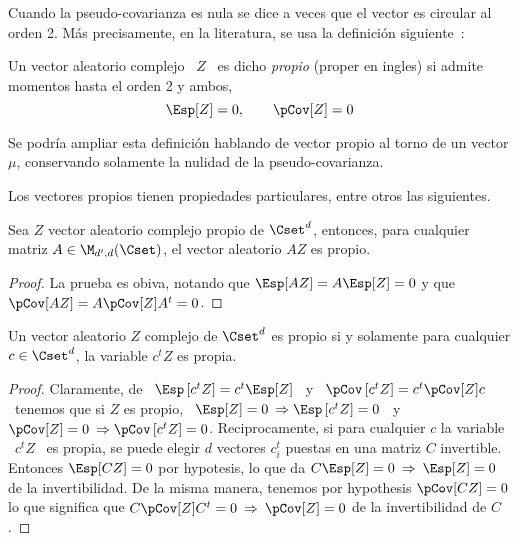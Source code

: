 Cuando la pseudo-covarianza es nula se dice a veces que el vector es circular al
orden  2.  M\'as  precisamente,  en   la  literatura,  se  usa  la  definici\'on
siguiente~\cite[Def.~17.4.1]{Lap17}:
%
\begin{definicion}\label{Def:MP:VectorAleatorioComplejoPropio}
%
  Un vector aleatorio complejo \ $Z$  \ es dicho {\em propio} (proper en ingles)
  si admite momentos hasta el orden 2 y ambos,
  \[
  \Esp[Z] = 0, \qquad \pCov[Z] = 0
  \]
\end{definicion}
%
Se podr\'ia ampliar  esta definici\'on hablando de vector propio  al torno de un
vector $\mu$, conservando solamente la nulidad de la pseudo-covarianza.

Los vectores propios tienen  propiedades particulares, entre otros las siguientes.

\begin{teorema}\label{Teo:MP:PropioLineal}
%
  Sea  $Z$  vector  aleatorio  complejo  propio  de  $\Cset^d$,  entonces,  para
  cualquier matriz $A \in \M_{d',d}(\Cset)$, el vector aleatorio $A Z$ es propio.
\end{teorema}
\begin{proof}
  La prueba es obiva, notando que $\Esp[A Z]  = A \Esp[Z] = 0$ y que $\pCov[A Z]
  = A \pCov[Z] A^t = 0$.
\end{proof}


\begin{teorema}\label{Teo:MP:PropioProy}
%
  Un vector  aleatorio $Z$ complejo de  $\Cset^d$ es propio si  y solamente para
  cualquier $c \in \Cset^d$, la variable $c^t Z$ es propia.
\end{teorema}
\begin{proof}
  Claramente, de \  $\Esp\left[ c^t Z \right] = c^t \Esp[Z]$  \ y \ $\pCov\left[
    c^t Z \right] = c^t \pCov[Z] c$ \ tenemos que si $Z$ es propio, \ $\Esp[Z] =
  0  \: \Rightarrow  \Esp\left[ c^t  Z  \right] =  0$ \  y  \ $\pCov[Z]  = 0  \:
  \Rightarrow \pCov\left[  c^tZ \right] =  0$. \newline Reciprocamente,  si para
  cualquier $c$ la variable \ $c^t Z$  \ es propia, se puede elegir $d$ vectores
  $c_i^t$ puestas  en una matriz  $C$ invertible. Entonces  $\Esp[C Z] =  0$ por
  hypotesis, lo  que da  $C \Esp[Z] =  0 \:  \Rightarrow \: \Esp[Z]  = 0$  de la
  invertibilidad. De la misma manera, tenemos por hypothesis $\pCov[C Z] = 0$ lo
  que significa que  $C \pCov[Z] C^t = 0  \: \Rightarrow \: \pCov[Z] =  0$ de la
  invertibilidad de $C$.
\end{proof}

